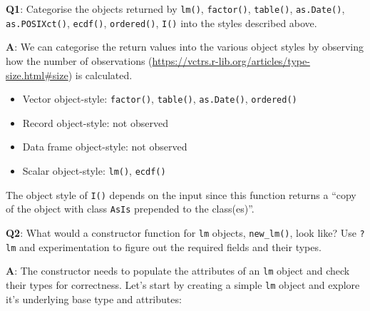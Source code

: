 \documentclass[
]{krantz}
\makeatletter
\newenvironment{Shaded}{\begin{snugshade}}{\end{snugshade}}
\newcommand{\CommentTok}[1]{\textcolor[rgb]{0.56,0.35,0.01}{\textit{#1}}}
\newcommand{\DataTypeTok}[1]{\textcolor[rgb]{0.13,0.29,0.53}{#1}}
\newcommand{\KeywordTok}[1]{\textcolor[rgb]{0.13,0.29,0.53}{\textbf{#1}}}
\newcommand{\NormalTok}[1]{#1}
\newcommand{\OperatorTok}[1]{\textcolor[rgb]{0.81,0.36,0.00}{\textbf{#1}}}
\newcommand{\StringTok}[1]{\textcolor[rgb]{0.31,0.60,0.02}{#1}}
\providecommand{\tightlist}{%
  \setlength{\itemsep}{0pt}\setlength{\parskip}{0pt}}
\renewcommand{\href}[2]{#2 (\url{#1})}
\newenvironment{kframe}{%
\medskip{}
\setlength{\fboxsep}{.8em}
 \def\at@end@of@kframe{}%
 \ifinner\ifhmode%
  \def\at@end@of@kframe{\end{minipage}}%
  \begin{minipage}{\columnwidth}%
 \fi\fi%
 \def\FrameCommand##1{\hskip\@totalleftmargin \hskip-\fboxsep
 \colorbox{shadecolor}{##1}\hskip-\fboxsep
     \hskip-\linewidth \hskip-\@totalleftmargin \hskip\columnwidth}%
 \MakeFramed {\advance\hsize-\width
   \@totalleftmargin\z@ \linewidth\hsize
   \@setminipage}}%
 {\par\unskip\endMakeFramed%
 \at@end@of@kframe}
\renewenvironment{Shaded}{\begin{kframe}}{\end{kframe}}
\renewcommand{\KeywordTok} [1]{\textcolor[rgb]{0.00,0.44,0.13}{{#1}}}
\renewcommand{\DataTypeTok}[1]{\textcolor[rgb]{0.56,0.13,0.00}{{#1}}}
\renewcommand{\StringTok}  [1]{\textcolor[rgb]{0.25,0.44,0.63}{{#1}}}
\renewcommand{\CommentTok} [1]{\textcolor[rgb]{0.38,0.63,0.69}{{#1}}}
\renewcommand{\NormalTok}  [1]{{#1}}
\makeatother
\begin{document}
\textbf{{Q1}}: Categorise the objects returned by \texttt{lm()}, \texttt{factor()}, \texttt{table()}, \texttt{as.Date()}, \texttt{as.POSIXct()}, \texttt{ecdf()}, \texttt{ordered()}, \texttt{I()} into the styles described above.

\textbf{{A}}: We can categorise the return values into the various object styles by observing how the \href{https://vctrs.r-lib.org/articles/type-size.html\#size}{number of observations} is calculated.

\begin{itemize}
\tightlist
\item
  Vector object-style: \texttt{factor()}, \texttt{table()}, \texttt{as.Date()}, \texttt{ordered()}
\item
  Record object-style: not observed
\item
  Data frame object-style: not observed
\item
  Scalar object-style: \texttt{lm()}, \texttt{ecdf()}
\end{itemize}

The object style of \texttt{I()} depends on the input since this function returns a ``copy of the object with class \texttt{AsIs} prepended to the class(es)''.

\textbf{{Q2}}: What would a constructor function for \texttt{lm} objects, \texttt{new\_lm()}, look like? Use \texttt{?lm} and experimentation to figure out the required fields and their types.

\textbf{{A}}: The constructor needs to populate the attributes of an \texttt{lm} object and check their types for correctness. Let's start by creating a simple \texttt{lm} object and explore it's underlying base type and attributes:

\begin{Shaded}
\end{Shaded}
\end{document}

